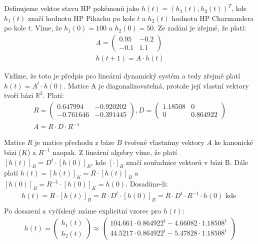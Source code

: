 \documentclass[12pt, a4paper]{article}
\begin{document}
\section{}
Definujeme vektor stavu HP pokémonů jako $h(t) = (h_1(t), h_2(t))^T$, kde $h_1(t)$ značí hodnotu HP Pikachu po kole $t$ a $h_2(t)$ hodnotu HP Charmandera po kole $t$. Víme, že $h_1(0)=100$ a $h_2(0)=50$. Ze zadání je zřejmé, že platí:
\begin{gather*}
A = \begin{pmatrix}
0.95 & -0.2\\
-0.1 & 1.1
\end{pmatrix}\\
h(t+1) = A \cdot h(t)
\end{gather*}

Vidíme, že toto je předpis pro lineární dynamický systém a tedy zřejmě platí $h(t) = A^{t}\cdot h(0)$.
Matice A je diagonalizovatelná, protože její vlastní vektory tvoří bázi $\mathbb{R}^2$. Platí:
\begin{gather*}
R = \begin{pmatrix}
0.647994 & -0.920202\\
-0.761646 & -0.391445
\end{pmatrix},
D = \begin{pmatrix}
1.18508 & 0\\
0 & 0.864922
\end{pmatrix}\\
A = R \cdot D \cdot R^{-1}
\end{gather*}

Matice $R$ je matice přechodu z báze $B$ tvořené vlastnímy vektory $A$ ke kanonické bázi ($K$) a $R^{-1}$ naopak. Z lineární algebry víme, že platí $[h(t)]_B = D^t \cdot [h(0)]_B$, kde $[\cdot]_B$ značí souřadnice vektorů v bázi B. Dále platí $h(t) = [h(t)]_K= R \cdot [h(t)]_B$ a $[h(0)]_B = R^{-1} \cdot [h(0)]_K = h(0)$. Dosadíme-li:
\begin{gather*}
h(t) = R \cdot [h(t)]_B = R \cdot D^t \cdot [h(0)]_B =  R \cdot D^t \cdot R^{-1} \cdot h(0) \text{ kde }\\
\end{gather*}
Po dosazení a vyčíslený máme explicitní vzorec pro $h(t)$:
\begin{gather*}
h(t) = \begin{pmatrix}
h_1(t)\\
h_2(t)
\end{pmatrix}\approx
\begin{pmatrix}
104.661 \cdot 0.864922^t - 4.66082 \cdot 1.18508^t\\
44.5217 \cdot 0.864922^t - 5.47828 \cdot 1.18508^t\\
\end{pmatrix}
\end{gather*}
\end{document}
